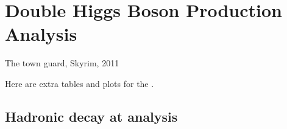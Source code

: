 \chapter{Double Higgs Boson Production Analysis}
\label{app:doubleHiggs}

{The town guard, Skyrim, 2011}


Here are extra tables and plots for the .

\section{Hadronic decay at  analysis}

